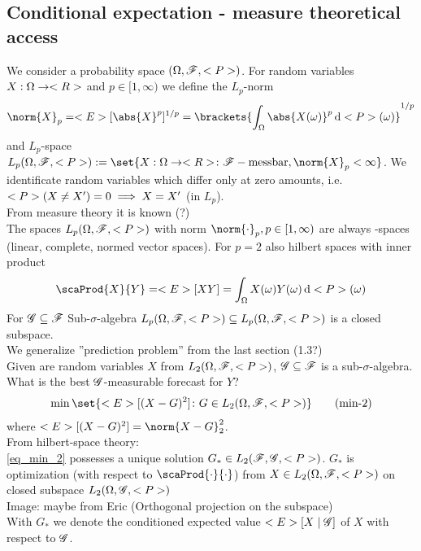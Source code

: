 \subsection{Conditional expectation - measure theoretical access}
We consider a probability space $(\O, \F,\P)$. For random variables $X: \O \to \R$ and $p \in [1,\infty)$ we define the $L_p$-norm
\begin{align*}
	\norm{X}_p = \E[\abs{X}^p]^{1/p} = \brackets{\int_{\O} \abs{X(\omega)}^p \d \P(\omega)}^{1/p}
\end{align*}
and $L_p$-space $L_p(\O,\F,\P):= \set{X: \O \to \R\colon \F-\text{messbar}, \norm{X}_p < \infty}$. We identificate random variables which differ only at zero amounts, i.e. $\P(X \neq X') = 0 \implies X = X'$ (in $L_p$).\\
From measure theory it is known (?)\\
The spaces $L_p(\O,\F,\P)$ with norm $\norm{\cdot}_p, p \in [1,\infty)$ are always -spaces (linear, complete, normed vector spaces). For $p = 2$ also hilbert spaces with inner product
\begin{align*}
	\scaProd{X}{Y} = \E[XY] = \int_{\O} X(\omega)Y(\omega)\d \P(\omega)
\end{align*}
For $\G \subseteq \F$ Sub-$\sigma$-algebra $L_p(\O,\F,\P) \subseteq L_p(\O,\F,\P)$ is a closed subspace.\\
We generalize ''prediction problem'' from the last section (1.3?)\\
Given are random variables $X$ from $L_2(\O,\F,\P)$, $\G \subseteq \F$ is a sub-$\sigma$-algebra.\\
What is the best $\G$-measurable forecast for $Y$?
\begin{align*}
	\min\set{\E[(X-G)^2] \colon G \in L_2(\O,\F,\P)} \tag{min-2}\label{eq_min_2}
\end{align*}
where $\E[(X-G)^2] = \norm{X-G}^2_2$.\\
From hilbert-space theory:\\
\eqref{eq_min_2} possesses a unique solution $G_{\ast} \in L_2(\F,\G,\P)$. $G_{\ast}$ is optimization (with respect to $\scaProd{\cdot}{\cdot}$) from $X \in L_2(\O,\F,\P)$ on closed subspace $L_2(\O,\G,\P)$\\
Image: maybe from Eric (Orthogonal projection on the subspace)\\
With $G_{\ast}$ we denote the conditioned expected value $\E[X\mid \G]$ of $X$ with respect to $\G$.
